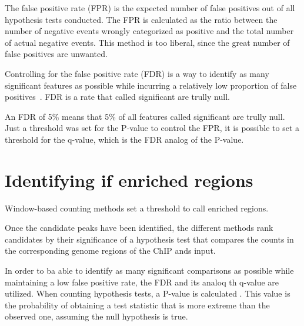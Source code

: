 The false positive rate (FPR) is the expected number of false positives out of all hypothesis tests conducted.
The FPR is calculated as the ratio between the number of negative events wrongly categorized as positive and the total number of actual negative events.
This method is too liberal, since the great number of false positives are unwanted.

Controlling for the false positive rate (FDR) is a way to identify as many significant features as possible while incurring a relatively low proportion of false positives~\cite{benjamini1995controlling}.
FDR is a rate that called significant are trully null.

An FDR of 5\% means that 5\% of all features called significant are trully null.
Just a threshold was set for the P-value to control the FPR, it is possible to set a threshold for the q-value, which is the FDR analog of the P-value.

\section{Identifying if enriched regions}

Window-based counting methods set a threshold to call enriched regions.

Once the candidate peaks have been identified, the different methods rank candidates by their significance of a hypothesis test that compares the counts in the corresponding genome regions of the ChIP ands input.

In order to ba able to identify as many significant comparisons as possible while maintaining a low false positive rate, the FDR and its analoq th q-value are utilized.
When counting hypothesis tests, a P-value is calculated .
This value is the probability of obtaining a test statistic that is more extreme than the observed one, assuming the null hypothesis is true.


